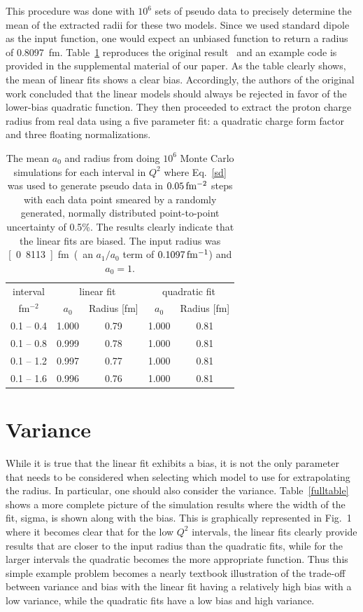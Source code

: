 \documentclass[10pt,aps,prc,twocolumn]{revtex4-1}
\begin{document}
This procedure was done with $10^6$ sets of pseudo data to 
precisely determine the mean of the extracted 
radii for these two models.   Since we used standard dipole as the input function, one would expect an unbiased 
function to return a radius of 0.8097~fm.
Table~\ref{ztable} reproduces the original result~\cite{Borkowski:1975ume} and
an example code is provided in the supplemental material of our paper.  
As the table clearly shows, the mean of linear fits shows a clear bias. 
Accordingly, the authors of the original work concluded that the linear models 
should always be rejected in favor of the lower-bias quadratic function.
They then proceeded to extract the proton charge radius from real data using a five parameter 
fit: a quadratic charge form factor and three floating normalizations.

\begin{table}
\caption{The mean $a_0$ and radius from doing $10^6$ Monte Carlo simulations
for each interval in $Q^2$
where Eq.~\ref{sd} was used to generate pseudo data in $\unit[0.05]{fm^{-2}}$ steps
with each data point smeared by a randomly generated, normally distributed point-to-point 
uncertainty of 0.5\%.
The results clearly indicate that the linear fits are biased.   The input
radius was \unit[0.8113]{fm} (an $a_1/a_0$ term of $\unit[0.1097]{fm^{-1}}$) and $a_0 = 1$.}
\begin{tabular}{c|cc|cc} \hline
interval       & \multicolumn{2}{c|}{linear fit} & \multicolumn{2}{c}{quadratic fit}  \\
fm$^{-2}$      & $a_0$      & Radius [fm]          & $a_0$    & Radius [fm] \\ \hline
 0.1 -- 0.4 & 1.000& 0.79& 1.000& 0.81 \\
 0.1 -- 0.8 & 0.999& 0.78& 1.000& 0.81 \\
 0.1 -- 1.2 & 0.997& 0.77& 1.000& 0.81 \\
 0.1 -- 1.6 & 0.996& 0.76& 1.000& 0.81 \\ \hline
\end{tabular}
\label{ztable}
\end{table}


\section{Variance}

While it is true that the linear fit exhibits a bias, it is not the only parameter that needs
to be considered when selecting which model to use for extrapolating the radius.
In particular, one should also consider the variance.
Table~\ref{fulltable} shows a more complete picture of the simulation results 
where the width of the fit, sigma, is 
shown along with the bias.   This is graphically represented in Fig.~1 where it becomes clear that 
for the low $Q^2$ intervals, the linear fits clearly provide results that are closer to
the input radius than the quadratic fits, while for the larger intervals the quadratic becomes
the more appropriate function.
Thus this simple example problem becomes a nearly textbook illustration of the trade-off between 
variance and bias with the linear fit having a relatively high bias with a low variance, while the 
quadratic fits have a low bias and high variance.
\end{document}
